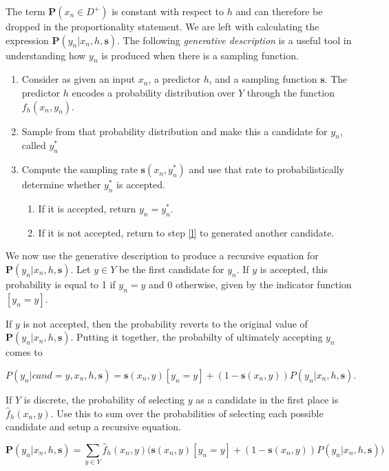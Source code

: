 \documentclass[twoside]{article}
\begin{document}
The term \(\mathbf{P}(x_n \in D^+)\) is constant with respect to \(h\) and can therefore be dropped in the proportionality statement. We are left with calculating the expression \(\mathbf{P}(y_n|x_n,h,\mathbf{s})\). The following \textit{generative description} is a useful tool in understanding how \(y_n\) is produced when there is a sampling function.

\begin{enumerate}
	\item Consider as given an input \(x_n\), a predictor \(h\), and a sampling function \(\mathbf{s}\). The predictor \(h\) encodes a probability distribution over \(Y\) through the function \(f_h(x_n,y_n)\).
	\item \label{l} Sample from that probability distribution and make this a candidate for \(y_n\), called \(y_n^*\)
	\item Compute the sampling rate \(\mathbf{s}(x_n,y_n^*)\) and use that rate to probabilistically determine whether \(y_n^*\) is accepted.
    \begin{enumerate}
        \item If it is accepted, return \(y_n=y_n^*\).
        \item If it is not accepted, return to step \ref{l} to generated another candidate.
    \end{enumerate}
\end{enumerate}

We now use the generative description to produce a recursive equation for \(\mathbf{P}(y_n|x_n,h,\mathbf{s})\). Let \(y \in Y\) be the first candidate for \(y_n\). If \(y\) is accepted, this probability is equal to 1 if \(y_n = y\) and 0 otherwise, given by the indicator function \(\left [y_n = y\right ]\).

If \(y\) is not accepted, then the probability reverts to the original value of \(\mathbf{P}(y_n|x_n,h,\mathbf{s})\). Putting it together, the probabilty of ultimately accepting \(y_n\) comes to

\[P(y_n|cand=y,x_n,h,\mathbf{s})=\mathbf{s}(x_n,y)\left [y_n = y\right ] + (1-\mathbf{s}(x_n,y))P(y_n|x_n,h,\mathbf{s}).\]

If \(Y\) is discrete, the probability of selecting \(y\) as a candidate in the first place is \(\hat{f}_h(x_n, y)\). Use this to sum over the probabilities of selecting each possible candidate and setup a recursive equation.

\begin{equation}
\label{eq:bias_corrected_setup}
\mathbf{P}(y_n|x_n,h,\mathbf{s})=\sum_{y \in Y}\hat{f}_h(x_n,y)\big(\mathbf{s}(x_n,y)\left [y_n = y\right ] + (1-\mathbf{s}(x_n,y))P(y_n|x_n,h,\mathbf{s})\big)
\end{equation}
\end{document}
